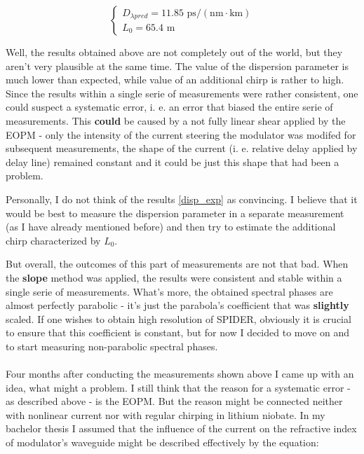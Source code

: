 \documentclass{article}
\begin{document}
\begin{equation}
\left\{\begin{array}{ll}
D_{\lambda pred} = 11.85\textrm{ ps}/(\textrm{nm}\cdot\textrm{km})\\
L_0 = 65.4\textrm{ m}
\end{array}\right.
\label{disp_exp}
\end{equation}
 
Well, the results obtained above are not completely out of the world, but they aren't very plausible at the same time. The value of the dispersion parameter is much lower than expected, while value of an additional chirp is rather to high. Since the results within a single serie of measurements were rather consistent, one could suspect a systematic error, i. e. an error that biased the entire serie of measurements. This \textbf{could} be caused by a not fully linear shear applied by the EOPM - only the intensity of the current steering the modulator was modifed for subsequent measurements, the shape of the current (i. e. relative delay applied by delay line) remained constant and it could be just this shape that had been a problem.

Personally, I do not think of the results \ref{disp_exp} as convincing. I believe that it would be best to measure the dispersion parameter in a separate measurement (as I have already mentioned before) and then try to estimate the additional chirp characterized by $L_0$.

But overall, the outcomes of this part of measurements are not that bad. When the \textbf{slope} method was applied, the results were consistent and stable within a single serie of measurements. What's more, the obtained spectral phases are almost perfectly parabolic - it's just the parabola's coefficient that was \textbf{slightly} scaled. If one wishes to obtain high resolution of SPIDER, obviously it is crucial to ensure that this coefficient is constant, but for now I decided to move on and to start measuring non-parabolic spectral phases.\\
\\

Four months after conducting the measurements shown above I came up with an idea, what might a problem. I still think that the reason for a systematic error - as described above - is the EOPM. But the reason might be  connected neither with nonlinear current nor with regular chirping in lithium niobate. In my bachelor thesis I assumed that the influence of the current on the refractive index of modulator's waveguide might be described effectively by the equation:
\end{document}
